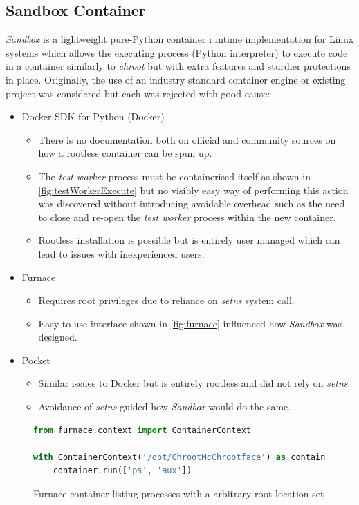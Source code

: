 \documentclass[hidelinks]{report}
\begin{document}
\subsection{Sandbox Container}\label{sandboxContainer}
\textit{Sandbox} is a lightweight pure-Python container runtime implementation for Linux systems which allows the executing process (Python interpreter) to execute code in a container similarly to \textit{chroot} but with extra features and sturdier protections in place.
Originally, the use of an industry standard container engine or existing project was considered but each was rejected with good cause:
\begin{itemize}
	\item Docker SDK for Python (Docker) \cite{docker-py}
	\begin{itemize}
		\item There is no documentation both on official and community sources on how a rootless container can be spun up.
		\item The \textit{test worker} process must be containerised itself as shown in \autoref{fig:testWorkerExecute} but no visibly easy way of performing this action was discovered without introducing avoidable overhead such as the need to close and re-open the \textit{test worker} process within the new container.
		\item Rootless installation is possible but is entirely user managed which can lead to issues with inexperienced users.
	\end{itemize}
	\item Furnace \cite{furnace}
	\begin{itemize}
		\item Requires root privileges due to reliance on \textit{setns} system call.
		\item Easy to use interface shown in \autoref{fig:furnace} influenced how \textit{Sandbox} was designed.
	\end{itemize}
	\item Pocket \cite{pocket}
	\begin{itemize}
		\item Similar issues to Docker but is entirely rootless and did not rely on \textit{setns}.
		\item Avoidance of \textit{setns} guided how \textit{Sandbox} would do the same.
	\end{itemize}
\end{itemize}
\begin{figure}[h]
	\centering
	\begin{lstlisting}[language=python, breaklines=true, linewidth=\linewidth, tabsize=4]
from furnace.context import ContainerContext

with ContainerContext('/opt/ChrootMcChrootface') as container:
    container.run(['ps', 'aux'])
	\end{lstlisting}
	\caption{Furnace container listing processes with a arbitrary root location set}
	\label{fig:furnace}
\end{figure}
\end{document}
